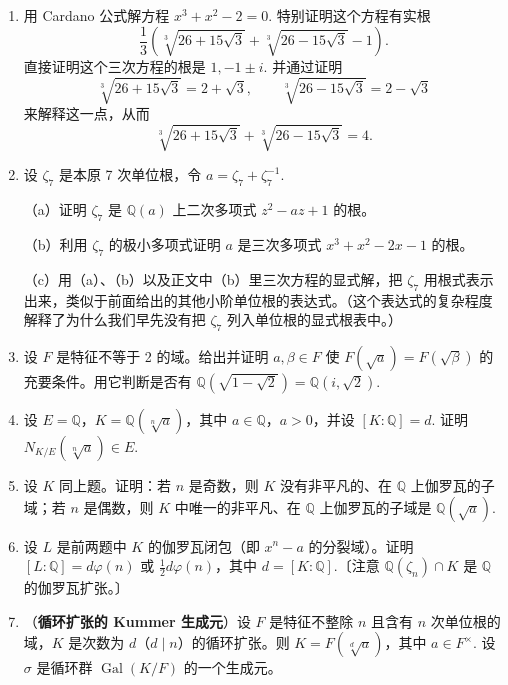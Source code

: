 \begin{enumerate}
\item 用 Cardano 公式解方程 \(x^3+x^2-2 = 0\). 特别证明这个方程有实根
\[
\frac{1}{3}\left(\sqrt[3]{26+15\sqrt{3}}+\sqrt[3]{26-15\sqrt{3}}-1\right).
\]
直接证明这个三次方程的根是 \(1, -1\pm i\). 并通过证明
\[
\sqrt[3]{26+15\sqrt{3}} = 2+\sqrt{3}, \qquad \sqrt[3]{26-15\sqrt{3}} = 2-\sqrt{3}
\]
来解释这一点，从而
\[
\sqrt[3]{26+15\sqrt{3}}+\sqrt[3]{26-15\sqrt{3}} = 4.
\]

\item 设 \(\zeta_7\) 是本原 7 次单位根，令 \(a = \zeta_7+\zeta_7^{-1}\).

（a）证明 \(\zeta_7\) 是 \(\mathbb{Q}(a)\) 上二次多项式 \(z^2-az+1\) 的根。

（b）利用 \(\zeta_7\) 的极小多项式证明 \(a\) 是三次多项式 \(x^3+x^2-2x-1\) 的根。

（c）用（a）、（b）以及正文中（b）里三次方程的显式解，把 \(\zeta_7\) 用根式表示出来，类似于前面给出的其他小阶单位根的表达式。（这个表达式的复杂程度解释了为什么我们早先没有把 \(\zeta_7\) 列入单位根的显式根表中。）

\item 设 \(F\) 是特征不等于 2 的域。给出并证明 \(a, \beta \in F\) 使 \(F(\sqrt{a}) = F(\sqrt{\beta})\) 的充要条件。用它判断是否有 \(\mathbb{Q}(\sqrt{1-\sqrt{2}}) = \mathbb{Q}(i, \sqrt{2})\).

\item 设 \(E = \mathbb{Q}\)，\(K = \mathbb{Q}(\sqrt[n]{a})\)，其中 \(a \in \mathbb{Q}\)，\(a > 0\)，并设 \([K:\mathbb{Q}] = d\). 证明 \(N_{K/E}(\sqrt[n]{a}) \in E\).

\item 设 \(K\) 同上题。证明：若 \(n\) 是奇数，则 \(K\) 没有非平凡的、在 \(\mathbb{Q}\) 上伽罗瓦的子域；若 \(n\) 是偶数，则 \(K\) 中唯一的非平凡、在 \(\mathbb{Q}\) 上伽罗瓦的子域是 \(\mathbb{Q}(\sqrt{a})\).

\item 设 \(L\) 是前两题中 \(K\) 的伽罗瓦闭包（即 \(x^n-a\) 的分裂域）。证明 \([L:\mathbb{Q}] = d\varphi(n)\) 或 \(\frac{1}{2}d\varphi(n)\)，其中 \(d = [K:\mathbb{Q}]\).〔注意 \(\mathbb{Q}(\zeta_n) \cap K\) 是 \(\mathbb{Q}\) 的伽罗瓦扩张。〕

\item （\textbf{循环扩张的 Kummer 生成元}）设 \(F\) 是特征不整除 \(n\) 且含有 \(n\) 次单位根的域，\(K\) 是次数为 \(d\)（\(d \mid n\)）的循环扩张。则 \(K = F(\sqrt[d]{a})\)，其中 \(a \in F^\times\). 设 \(\sigma\) 是循环群 \(\operatorname{Gal}(K/F)\) 的一个生成元。


\end{enumerate}
